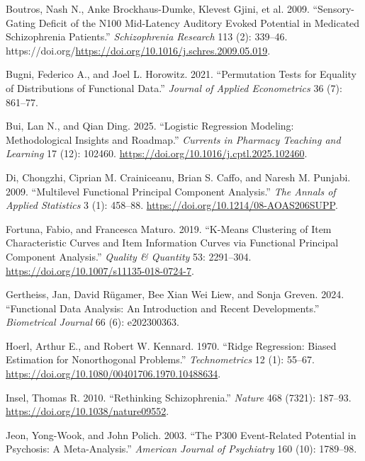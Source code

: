 \documentclass{article}
\newlength{\cslhangindent}
\newenvironment{CSLReferences}[2] %
 {\begin{list}{}{%
  \setlength{\itemindent}{0pt}
  \setlength{\leftmargin}{0pt}
  \setlength{\parsep}{0pt}
  \ifodd #1
   \setlength{\leftmargin}{\cslhangindent}
   \setlength{\itemindent}{-1\cslhangindent}
  \fi
  \setlength{\itemsep}{#2\baselineskip}}}
 {\end{list}}
\begin{document}
\protect{}\label{refs}
\begin{CSLReferences}{1}{1}
Boutros, Nash N., Anke Brockhaus-Dumke, Klevest Gjini, et al. 2009.
{``Sensory-Gating Deficit of the N100 Mid-Latency Auditory Evoked
Potential in Medicated Schizophrenia Patients.''} \emph{Schizophrenia
Research} 113 (2): 339--46.
https://doi.org/\url{https://doi.org/10.1016/j.schres.2009.05.019}.

Bugni, Federico A., and Joel L. Horowitz. 2021. {``Permutation Tests for
Equality of Distributions of Functional Data.''} \emph{Journal of
Applied Econometrics} 36 (7): 861--77.

Bui, Lan N., and Qian Ding. 2025. {``Logistic Regression Modeling:
Methodological Insights and Roadmap.''} \emph{Currents in Pharmacy
Teaching and Learning} 17 (12): 102460.
\url{https://doi.org/10.1016/j.cptl.2025.102460}.

Di, Chongzhi, Ciprian M. Crainiceanu, Brian S. Caffo, and Naresh M.
Punjabi. 2009. {``Multilevel Functional Principal Component Analysis.''}
\emph{The Annals of Applied Statistics} 3 (1): 458--88.
\url{https://doi.org/10.1214/08-AOAS206SUPP}.

Fortuna, Fabio, and Francesca Maturo. 2019. {``K-Means Clustering of
Item Characteristic Curves and Item Information Curves via Functional
Principal Component Analysis.''} \emph{Quality \& Quantity} 53:
2291--304. \url{https://doi.org/10.1007/s11135-018-0724-7}.

Gertheiss, Jan, David Rügamer, Bee Xian Wei Liew, and Sonja Greven.
2024. {``Functional Data Analysis: An Introduction and Recent
Developments.''} \emph{Biometrical Journal} 66 (6): e202300363.

Hoerl, Arthur E., and Robert W. Kennard. 1970. {``Ridge Regression:
Biased Estimation for Nonorthogonal Problems.''} \emph{Technometrics} 12
(1): 55--67. \url{https://doi.org/10.1080/00401706.1970.10488634}.

Insel, Thomas R. 2010. {``Rethinking Schizophrenia.''} \emph{Nature} 468
(7321): 187--93. \url{https://doi.org/10.1038/nature09552}.

Jeon, Yong-Wook, and John Polich. 2003. {``The P300 Event-Related
Potential in Psychosis: A Meta-Analysis.''} \emph{American Journal of
Psychiatry} 160 (10): 1789--98.


\end{CSLReferences}
\end{document}
